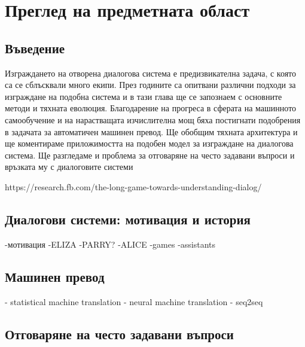 \chapter{Преглед на предметната област} %

\label{Chapter2} 


\section{Въведение}
Изграждането на отворена диалогова система е предизвикателна задача, с която са се сблъсквали много екипи. През годините са опитвани различни подходи за изграждане на подобна система и в тази глава ще се запознаем с основните методи и тяхната еволюция. 
Благодарение на прогреса в сферата на машинното самообучение и на нарастващата изчислителна мощ бяха постигнати подобрения в задачата за автоматичен машинен превод. Ще обобщим тяхната архитектура и ще коментираме приложимостта на подобен модел за изграждане на диалогова система.
Ще разгледаме и проблема за отговаряне на често задавани въпроси и връзката му с диалоговите системи


https://research.fb.com/the-long-game-towards-understanding-dialog/

\section{Диалогови системи: мотивация и история}

-мотивация
-ELIZA
-PARRY?
-ALICE
-games
-assistants

\section{Машинен превод}
- statistical machine translation
- neural machine translation
- seq2seq


\section{Отговаряне на често задавани въпроси}
